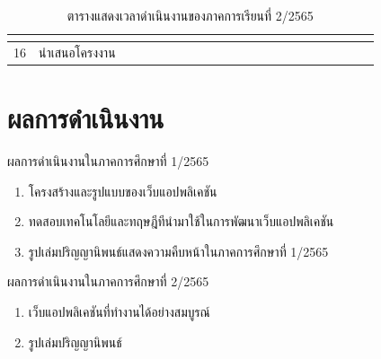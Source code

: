 \documentclass[12pt,oneside,openright,a4paper]{cpe-thai-project}
\begin{document}
\begin{table}[!h]
{\begin{tabular}{|llllllllllllllllllllll|}
      \multicolumn{1}{l|}{} &
      \multicolumn{1}{l|}{} &
      \multicolumn{1}{l|}{} &
      \multicolumn{1}{l|}{} &
      \multicolumn{1}{l|}{} &
      \multicolumn{1}{l|}{} &
      \multicolumn{1}{l|}{} &
      \multicolumn{1}{l|}{} &
      \multicolumn{1}{l|}{\cellcolor[HTML]{FFCE93}} &
      \multicolumn{1}{l|}{\cellcolor[HTML]{FFCE93}} &
      \multicolumn{1}{l|}{\cellcolor[HTML]{FFCE93}} &
      \multicolumn{1}{l|}{\cellcolor[HTML]{FFCE93}} &
      \multicolumn{1}{l|}{\cellcolor[HTML]{FFCE93}} &
      \multicolumn{1}{l|}{\cellcolor[HTML]{FFCE93}} &
      \multicolumn{1}{l|}{\cellcolor[HTML]{FFCE93}} &
      \multicolumn{1}{l|}{\cellcolor[HTML]{FFCE93}} &
      \multicolumn{1}{l|}{} &
      \multicolumn{1}{l|}{} &
      \multicolumn{1}{l|}{} &
       \\ \hline
    \multicolumn{1}{|l|}{16} &
      \multicolumn{1}{l|}{นำเสนอโครงงาน} &
      \multicolumn{1}{l|}{} &
      \multicolumn{1}{l|}{} &
      \multicolumn{1}{l|}{} &
      \multicolumn{1}{l|}{} &
      \multicolumn{1}{l|}{} &
      \multicolumn{1}{l|}{} &
      \multicolumn{1}{l|}{} &
      \multicolumn{1}{l|}{} &
      \multicolumn{1}{l|}{} &
      \multicolumn{1}{l|}{} &
      \multicolumn{1}{l|}{} &
      \multicolumn{1}{l|}{} &
      \multicolumn{1}{l|}{} &
      \multicolumn{1}{l|}{} &
      \multicolumn{1}{l|}{} &
      \multicolumn{1}{l|}{\cellcolor[HTML]{FFCE93}} &
      \multicolumn{1}{l|}{} &
      \multicolumn{1}{l|}{} &
      \multicolumn{1}{l|}{} &
       \\ \hline
    \end{tabular} %
    }
    \caption{\centering  ตารางแสดงเวลาดำเนินงานของภาคการเรียนที่ 2/2565} \label{tbl:working2}
\end{table}



\section{ผลการดำเนินงาน}
\hspace*{1cm} ผลการดำเนินงานในภาคการศึกษาที่ 1/2565
\begin{enumerate}
  \item โครงสร้างและรูปแบบของเว็บแอปพลิเคชัน
  \item ทดสอบเทคโนโลยีและทฤษฎีทีนำมาใช้ในการพัฒนาเว็บแอปพลิเคชัน
  \item รูปเล่มปริญญานิพนธ์แสดงความคืบหน้าในภาคการศึกษาที่ 1/2565
\end{enumerate}
\hspace*{1cm} ผลการดำเนินงานในภาคการศึกษาที่ 2/2565
\begin{enumerate}
  \item เว็บแอปพลิเคชันที่ทำงานได้อย่างสมบูรณ์
  \item รูปเล่มปริญญานิพนธ์
\end{enumerate}
\end{document}
